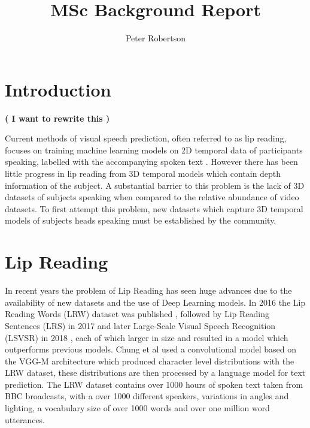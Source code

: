 \documentclass[12pt]{article}
\title{MSc Background Report}
\author{Peter Robertson}
\date{}
\begin{document}
\maketitle

\setcounter{page}{0}
\clearpage{\pagestyle{empty}\cleardoublepage}

\tableofcontents 
\clearpage{\pagestyle{empty}\cleardoublepage}


\setcounter{page}{1}

\section{Introduction}

\textbf{( I want to rewrite this )}

Current methods of visual speech prediction, often referred to as lip reading, focuses on training machine learning models on 2D temporal data of participants speaking, labelled with the accompanying spoken text \cite{Chung2016, Assael2016, Chung2017, Shillingford2018}.
However there has been little progress in lip reading from 3D temporal models which contain depth information of the subject.
A substantial barrier to this problem is the lack of 3D datasets of subjects speaking when compared to the relative abundance of video datasets.
To first attempt this problem, new datasets which capture 3D temporal models of subjects heads speaking must be established by the community.

\section{Lip Reading}
In recent years the problem of Lip Reading has seen huge advances due to the availability of new datasets and the use of Deep Learning models.
In 2016 the Lip Reading Words (LRW) dataset was published \cite{Chung2016}, followed by Lip Reading Sentences (LRS) in 2017 \cite{Chung2017} and later Large-Scale Visual Speech Recognition (LSVSR) in 2018 \cite{Shillingford2018}, each of which larger in size and resulted in a model which outperforms previous models.
Chung et al \cite{Chung2016} used a convolutional model based on the VGG-M architecture which produced character level distributions with the LRW dataset, these distributions are then processed by a language model for text prediction.
The LRW dataset contains over 1000 hours of spoken text taken from BBC broadcasts, with a over 1000 different speakers, variations in angles and lighting, a vocabulary size of over 1000 words and over one million word utterances.
\end{document}
